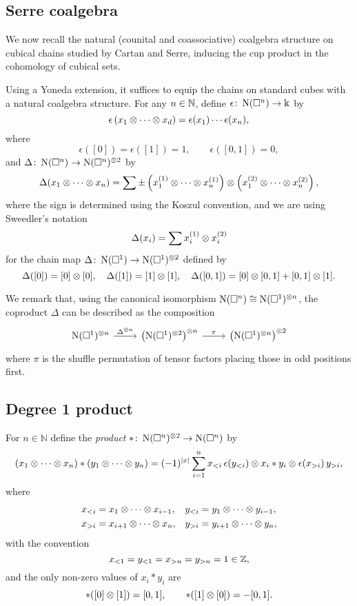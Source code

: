 \subsection{Serre coalgebra} \label{ss:serre coalgebra}

We now recall the natural (counital and coassociative) coalgebra structure on cubical chains studied by Cartan and Serre, inducing the cup product in the cohomology of cubical sets.

Using a Yoneda extension, it suffices to equip the chains on standard cubes with a natural coalgebra structure.
For any $n \in \mathbb{N}$, define $\epsilon \colon \operatorname{N}(\square^n) \to \Bbbk$ by
\[
\epsilon \left( x_1 \otimes \dotsb \otimes x_d \right) = \epsilon(x_1) \dotsm \epsilon(x_n),
\]
where
\[
\epsilon([0]) = \epsilon([1]) = 1, \qquad \epsilon([0, 1]) = 0,
\]
and $\Delta \colon \operatorname{N}(\square^n) \to \operatorname{N}(\square^n)^{\otimes 2}$ by
\[
\Delta (x_1 \otimes \dotsb \otimes x_n) =
\sum \pm \left( x_1^{(1)} \otimes \dotsb \otimes x_n^{(1)} \right) \otimes
\left( x_1^{(2)} \otimes \dotsb \otimes x_n^{(2)} \right),
\]
where the sign is determined using the Koszul convention, and we are using Sweedler's notation
\[
\Delta(x_i) = \sum x_i^{(1)} \otimes x_i^{(2)}
\]
for the chain map $\Delta \colon \operatorname{N}(\square^1) \to \operatorname{N}(\square^1)^{\otimes 2}$ defined by
\[
\Delta([0]) = [0] \otimes [0], \quad \Delta([1]) = [1] \otimes [1], \quad \Delta([0,1]) = [0] \otimes [0,1] + [0,1] \otimes [1].
\]

We remark that, using the canonical isomorphism $\operatorname{N}(\square^n) \cong \operatorname{N}(\square^1)^{\otimes n}$, the coproduct $\Delta$ can be described as the composition
\[
\begin{tikzcd}
\chains(\cube^1)^{\ot n} \arrow[r, "\Delta^{\ot n}"] & \left( \chains(\cube^1)^{\ot 2} \right)^{\ot n} \arrow[r, "\pi"] & \left( \chains(\cube^1)^{\ot n} \right)^{\ot 2}
\end{tikzcd}
\]
where $\pi$ is the shuffle permutation of tensor factors placing those in odd positions first.

\subsection{Degree 1 product}

For $n \in \mathbb{N}$ define the \textit{product} $\ast  \colon \operatorname{N}(\square^n)^{\otimes 2} \to \operatorname{N}(\square^n)$ by
\begin{align*}
(x_1 \otimes \dotsb \otimes x_n) \ast (y_1 \otimes \dotsb \otimes y_n) =
(-1)^{|x|} \sum_{i=1}^n x_{<i}\, \epsilon(y_{<i}) \otimes x_i \ast y_i \otimes \epsilon(x_{>i}) \, y_{>i},
\end{align*}
where
\begin{align*}
x_{<i} & = x_1 \otimes \dotsb \otimes x_{i-1}, &
y_{<i} & = y_1 \otimes \dotsb \otimes y_{i-1}, \\
x_{>i} & = x_{i+1} \otimes \dotsb \otimes x_n, &
y_{>i} & = y_{i+1} \otimes \dotsb \otimes y_n,
\end{align*}
with the convention
\[
x_{<1} = y_{<1} = x_{>n} = y_{>n} = 1 \in \mathbb{Z},
\]
and the only non-zero values of $x_i \ast y_i$ are
\[
\ast([0] \otimes [1]) = [0, 1], \qquad  \ast([1] \otimes [0]) = -[0, 1].
\]

